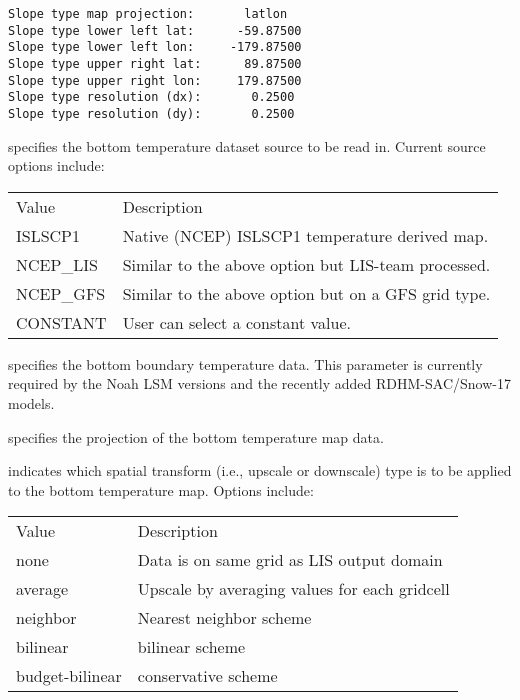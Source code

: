  \begin{Verbatim}[frame=single]
Slope type map projection:       latlon
Slope type lower left lat:      -59.87500
Slope type lower left lon:     -179.87500
Slope type upper right lat:      89.87500
Slope type upper right lon:     179.87500
Slope type resolution (dx):       0.2500
Slope type resolution (dy):       0.2500
 \end{Verbatim}

 

  specifies the bottom temperature
 dataset source to be read in. Current source options include:

 \begin{tabular}{ll}
 Value         & Description    \\
 ISLSCP1       &  Native (NCEP) ISLSCP1 temperature derived map. \\
 NCEP\_LIS     &  Similar to the above option but LIS-team processed. \\
 NCEP\_GFS     &  Similar to the above option but on a GFS grid type. \\
 CONSTANT      &  User can select a constant value. \\
 \end{tabular}

  specifies the bottom boundary
 temperature data.
 This parameter is currently required by the Noah LSM versions
  and the recently added RDHM-SAC/Snow-17 models.

  specifies the projection of the
 bottom temperature map data.

  indicates which spatial
 transform (i.e., upscale or downscale) type is to be applied to 
 the bottom temperature map.  Options include:

 \begin{tabular}{ll}
 Value           & Description                                   \\
 none            & Data is on same grid as LIS output domain     \\
 average         & Upscale by averaging values for each gridcell \\
 neighbor        & Nearest neighbor scheme                       \\
 bilinear        & bilinear scheme                               \\
 budget-bilinear & conservative scheme                           \\
 \end{tabular}
 

